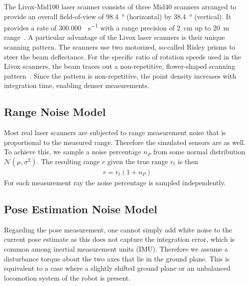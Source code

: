 \documentclass[5p]{elsarticle}
\begin{document}
The Livox-Mid100 laser scanner consists of three Mid40 scanners arranged to provide an overall field-of-view of \SI{98.4}{\degree} (horizontal) by \SI{38.4}{\degree} (vertical).
It provides a rate of \SI[per-mode=symbol]{300,000}{\pts\per\second} with a range precision of \SI{2}{\centi\meter} up to \SI{20}{\meter} range~\cite{LivoxMid40-100}.
A particular advantage of the Livox laser scanners is their unique scanning pattern.
The scanners use two motorized, so-called Risley prisms to steer the beam deflectance.
For the specific ratio of rotation speeds used in the Livox scanners, the beam traces out a non-repetitive, flower-shaped scanning pattern~\cite{thorlabs}.
Since the pattern is non-repetitive, the point density increases with integration time, enabling denser measurements.

\subsection{Range Noise Model}

Most real laser scanners are subjected to range measurement noise that is proportional to the measured range. 
Therefore the simulated sensors are as well. 
To achieve this, we sample a noise percentage $n_P$ from some normal distribution $\mathcal{N}(\mu,\sigma^2)$. 
The resulting range $r$ given the true range $r_t$ is then
\begin{align}
	r = r_t(1+n_P)
\end{align}
For each measurement ray the noise percentage is sampled independently. 

\subsection{Pose Estimation Noise Model} 

Regarding the pose measurement, one cannot simply add white noise to the current pose estimate as this does not capture the integration error, which is common among inertial measurement units (IMU). 
Therefore we assume a disturbance torque about the two axes that lie in the ground plane. 
This is equivalent to a case where a slightly shifted ground plane or an unbalanced locomotion system of the robot is present.  
\end{document}
